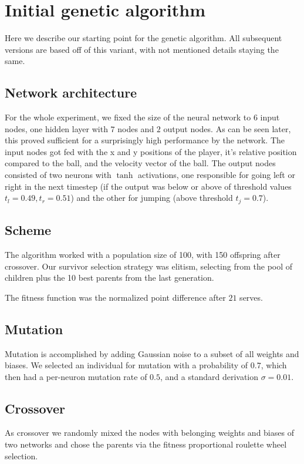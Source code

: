 \documentclass[11pt,a4paper]{scrartcl}
\begin{document}
\section{Initial genetic algorithm}
Here we describe our starting point for the genetic algorithm. All subsequent versions are based off of this variant, with not mentioned details staying the same.

\subsection{Network architecture}

For the whole experiment, we fixed the size of the neural network to $6$ input nodes, one hidden layer with $7$ nodes and $2$ output nodes. As can be seen later, this proved sufficient for a surprisingly high performance by the network. The input nodes got fed with the x and y positions of the player, it's relative position compared to the ball, and the velocity vector of the ball.
The output nodes consisted of two neurons with $\tanh$ activations, one responsible for going left or right in the next timestep (if the output was below or above of threshold values $t_l = 0.49, t_r = 0.51$) and the other for jumping (above threshold $t_j = 0.7$).

\subsection{Scheme}
The algorithm worked with a population size of 100, with 150 offspring after crossover. Our survivor selection strategy was elitism, selecting from the pool of children plus the 10 best parents from the last generation.

The fitness function was the normalized point difference after $21$ serves.

\subsection{Mutation}
Mutation is accomplished by adding Gaussian noise to a subset of all weights and biases. We selected an individual for mutation with a probability of $0.7$, which then had a per-neuron mutation rate of $0.5$, and a standard derivation $\sigma=0.01$.

\subsection{Crossover}
As crossover we randomly mixed the nodes with belonging weights and biases of two networks and chose the parents via the fitness proportional roulette wheel selection.
\end{document}
